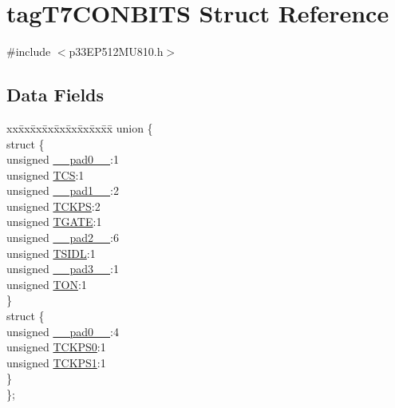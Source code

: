 \hypertarget{structtag_t7_c_o_n_b_i_t_s}{}\section{tag\+T7\+C\+O\+N\+B\+I\+TS Struct Reference}
\label{structtag_t7_c_o_n_b_i_t_s}


{\ttfamily \#include $<$p33\+E\+P512\+M\+U810.\+h$>$}

\subsection*{Data Fields}
\begin{DoxyCompactItemize}
\item 
\begin{tabbing}
xx\=xx\=xx\=xx\=xx\=xx\=xx\=xx\=xx\=\kill
union \{\\
\>struct \{\\
\>\>unsigned \hyperlink{structtag_t7_c_o_n_b_i_t_s_adf71f3d8410c1f1dbbc96680a92c49af}{\_\_pad0\_\_}:1\\
\>\>unsigned \hyperlink{structtag_t7_c_o_n_b_i_t_s_ab4daee3a10870ffba1c86d5020adb9b4}{TCS}:1\\
\>\>unsigned \hyperlink{structtag_t7_c_o_n_b_i_t_s_acaf2d0924a107ec6e8d2e31febaf66f9}{\_\_pad1\_\_}:2\\
\>\>unsigned \hyperlink{structtag_t7_c_o_n_b_i_t_s_a0d455d68434019feaabe9dfb64d75552}{TCKPS}:2\\
\>\>unsigned \hyperlink{structtag_t7_c_o_n_b_i_t_s_a35b6e4b591a8bd20e026168399eb0e6a}{TGATE}:1\\
\>\>unsigned \hyperlink{structtag_t7_c_o_n_b_i_t_s_a4d97cc5f7d51d22fc2bf3eab35c9cb7f}{\_\_pad2\_\_}:6\\
\>\>unsigned \hyperlink{structtag_t7_c_o_n_b_i_t_s_a4971b881615ef42703b5b78179fcda3d}{TSIDL}:1\\
\>\>unsigned \hyperlink{structtag_t7_c_o_n_b_i_t_s_ad7d7cee33e0c7f447abc4d171c628dd4}{\_\_pad3\_\_}:1\\
\>\>unsigned \hyperlink{structtag_t7_c_o_n_b_i_t_s_a8c2a094047d1019ce1c5b25ea8cff9b3}{TON}:1\\
\>\} \\
\>struct \{\\
\>\>unsigned \hyperlink{structtag_t7_c_o_n_b_i_t_s_adf71f3d8410c1f1dbbc96680a92c49af}{\_\_pad0\_\_}:4\\
\>\>unsigned \hyperlink{structtag_t7_c_o_n_b_i_t_s_a5cd4ef74604f5d88289a53f41cf38b7e}{TCKPS0}:1\\
\>\>unsigned \hyperlink{structtag_t7_c_o_n_b_i_t_s_ae190f2375c403c9fe8f5eb62a5bdf200}{TCKPS1}:1\\
\>\} \\
\}; \\

\end{tabbing}\end{DoxyCompactItemize}


